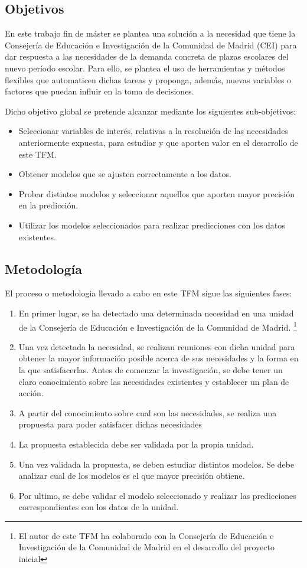 \subsection{Objetivos}
En este trabajo fin de máster se plantea una solución a la necesidad que tiene la Consejería de Educación e Investigación de la Comunidad de Madrid (CEI) para dar respuesta a las necesidades de la demanda concreta de plazas escolares del nuevo período escolar. Para ello, se plantea el uso de herramientas y métodos flexibles que automaticen dichas tareas y proponga, además, nuevas variables o factores que puedan influir en la toma de decisiones. 

Dicho objetivo global se pretende alcanzar mediante los siguientes sub-objetivos:
\begin{itemize}
	\item Seleccionar variables de interés, relativas a la resolución de las necesidades anteriormente expuesta, para estudiar y que aporten valor en el desarrollo de este TFM.
	\item Obtener modelos que se ajusten correctamente a los datos.
	\item Probar distintos modelos y seleccionar aquellos que aporten mayor precisión en la predicción. 
	\item Utilizar los modelos seleccionados para realizar predicciones con los datos existentes. 
\end{itemize}

\subsection{Metodología}
El proceso o metodologia llevado a cabo en este TFM sigue las siguientes fases:
\begin{enumerate}
	\item En primer lugar, se ha detectado una determinada necesidad en una unidad de la Consejería de Educación e Investigación de la Comunidad de Madrid. \footnote{El autor de este TFM ha colaborado con la Consejería de Educación e Investigación de la Comunidad de Madrid en el desarrollo del proyecto inicial} 
	\item Una vez detectada la necesidad, se realizan reuniones con dicha unidad para obtener la mayor información posible acerca de sus necesidades y la forma en la que satisfacerlas. Antes de comenzar la investigación, se debe tener un claro conocimiento sobre las necesidades existentes y establecer un plan de acción.
	\item A partir del conocimiento sobre cual son las necesidades, se realiza una propuesta para poder satisfacer dichas necesidades
	\item La propuesta establecida debe ser validada por la propia unidad.
	\item Una vez validada la propuesta, se deben estudiar distintos modelos. Se debe analizar cual de los modelos es el que mayor precisión obtiene.
	\item Por ultimo, se debe validar el modelo seleccionado y realizar las predicciones correspondientes con los datos de la unidad.
\end{enumerate}

